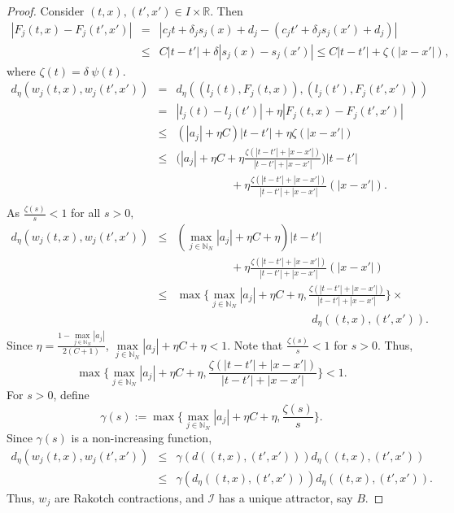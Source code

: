 \documentclass[10pt,a4paper]{amsart}
\begin{document}
\begin{proof}
Consider $(t,x),(t',x') \in I\times\mathbb{R}$. Then
\begin{eqnarray*}
    |F_j(t,x)-F_j(t',x')|&=&|c_jt+\delta_js_j(x)+d_j-(c_jt'+\delta_js_j(x')+d_j)|\\
    &\leq&C|t-t'|+\delta|s_j(x)-s_j(x')|\leq C|t-t'|+\zeta(|x-x'|),
\end{eqnarray*}
where $\zeta(t)=\delta~\psi(t)$.
\begin{eqnarray*}
d_\eta(w_j(t,x),w_j(t',x'))&=& d_\eta((l_j(t),F_j(t,x)),(l_j(t'),F_j(t',x')))\\
&=& |l_j(t)-l_j(t')|+\eta|F_j(t,x)-F_j(t',x')|\\
&\leq&(|a_j|+\eta C)|t-t'|+\eta\zeta(|x-x'|)\\
&\leq&\bigg(|a_j|+\eta C+\eta\frac{\zeta(|t-t'|+|x-x'|)}{|t-t'|+|x-x'|}\bigg)|t-t'|\\
& &\hspace{2cm}+\eta\frac{\zeta(|t-t'|+|x-x'|)}{|t-t'|+|x-x'|}(|x-x'|).\\
\end{eqnarray*}
As $\frac{\zeta(s)}{s}<1 $ for all $ 
s>0,$
\begin{eqnarray*}
d_\eta(w_j(t,x),w_j(t',x'))&\leq&(\max\limits_{j\in\mathbb N_N} |a_j|+\eta C+\eta)|t-t'| \\
& &\hspace{2cm}+\eta\frac{\zeta(|t-t'|+|x-x'|)}{|t-t'|+|x-x'|}(|x-x'|)\\
&\leq&\max\{\max\limits_{j\in\mathbb N_N
} |a_j|+\eta C+\eta,\frac{\zeta(|t-t'|+|x-x'|)}{|t-t'|+|x-x'|}\} \times \\
& &\hspace{5cm} d_\eta((t,x),(t',x')).
\end{eqnarray*}
 Since $\eta=\frac{1-\max\limits_{j\in\mathbb N_N}|a_j|}{2(C+1)}$, $\max\limits_{j\in\mathbb N_N}|a_j|+\eta C+\eta<1$. Note that $\frac{\zeta(s)}{s}<1$ for $s>0$. Thus,
\begin{equation*}
\max\{\max\limits_{j\in\mathbb N_N} |a_j|+\eta C+\eta,\frac{\zeta(|t-t'|+|x-x'|)}{|t-t'|+|x-x'|}\}<1.
\end{equation*}
For $s>0$, define
\begin{equation*}
\gamma(s):=\max\{\max\limits_{j\in\mathbb N_N} |a_j|+\eta C+\eta,\frac{\zeta(s)}{s}\}.
\end{equation*}
Since $\gamma(s)$ is a non-increasing function,
\begin{eqnarray*}
d_\eta(w_j(t,x),w_j(t',x'))&\leq& \gamma(d((t,x),(t',x')))d_\eta((t,x),(t',x'))\\
&\leq&\gamma(d_\eta((t,x),(t',x')))d_\eta((t,x),(t',x')).
\end{eqnarray*}
Thus, $w_j$ are Rakotch contractions, and $\mathcal{I}$ has a unique attractor, say $B$.


\end{proof}
\end{document}
